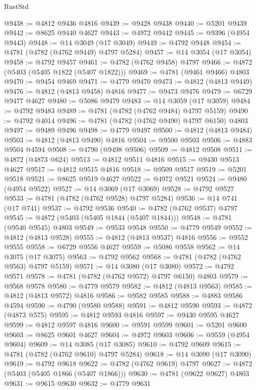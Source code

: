\begin{lexlean}{RustStd}
\begin{coremodule}
@9438 := @4812 @9436 @4816
@9439 := @9428 @9438
@9440 := @5201 @9439
@9442 := @8625 @9440 @4627
@9443 := @4972 @9442
@9445 := @9396 (@4954 @9443)
@9448 := @14 @3049 (@17 @3049)
@9449 := @4792 @9448
@9454 := @4781 (@4782 (@4762 @9449) @4797 @5284)
@9457 := @14 @3054 (@17 @3054)
@9458 := @4792 @9457
@9461 := @4782 (@4762 @9458) @4797
@9466 := @4872 (@5403 (@5405 @1822 (@5407 @1822)))
@9469 := @4781 (@9461 @9466) @4803
@9470 := @9454 @9469
@9471 := @4779 @9470
@9473 := @4812 (@4813 @9449)
@9476 := @4812 (@4813 @9458) @4816
@9477 := @9473 @9476
@9479 := @6729 @9477 @4627
@9480 := @5086 @9479
@9483 := @14 @3059 (@17 @3059)
@9484 := @4792 @9483
@9489 := @4781 (@4782 (@4762 @9484) @4797 @5159)
@9490 := @4792 @4014
@9496 := @4781 (@4782 (@4762 @9490) @4797 @6150) @4803
@9497 := @9489 @9496
@9498 := @4779 @9497
@9500 := @4812 (@4813 @9484)
@9503 := @4812 (@4813 @9490) @4816
@9504 := @9500 @9503
@9506 := @4883 @9504 @4594
@9508 := @4790 (@9498 @9506)
@9509 := @4812 @9508
@9511 := @4872 (@4873 @624)
@9513 := @4812 @9511 @4816
@9515 := @9430 @9513 @4627
@9517 := @4812 @9515 @4816
@9518 := @9509 @9517
@9519 := @5201 @9518
@9521 := @8625 @9519 @4627
@9522 := @4972 @9521
@9524 := @9480 (@4954 @9522)
@9527 := @14 @3069 (@17 @3069)
@9528 := @4792 @9527
@9533 := @4781 (@4782 (@4762 @9528) @4797 @5284)
@9536 := @14 @741 (@17 @741)
@9537 := @4792 @9536
@9540 := @4782 (@4762 @9537) @4797
@9545 := @4872 (@5403 (@5405 @1844 (@5407 @1844)))
@9548 := @4781 (@9540 @9545) @4803
@9549 := @9533 @9548
@9550 := @4779 @9549
@9552 := @4812 (@4813 @9528)
@9555 := @4812 (@4813 @9537) @4816
@9556 := @9552 @9555
@9558 := @6729 @9556 @4627
@9559 := @5086 @9558
@9562 := @14 @3075 (@17 @3075)
@9563 := @4792 @9562
@9568 := @4781 (@4782 (@4762 @9563) @4797 @5159)
@9571 := @14 @3080 (@17 @3080)
@9572 := @4792 @9571
@9578 := @4781 (@4782 (@4762 @9572) @4797 @6150) @4803
@9579 := @9568 @9578
@9580 := @4779 @9579
@9582 := @4812 (@4813 @9563)
@9585 := @4812 (@4813 @9572) @4816
@9586 := @9582 @9585
@9588 := @4883 @9586 @4594
@9590 := @4790 (@9580 @9588)
@9591 := @4812 @9590
@9593 := @4872 (@4873 @575)
@9595 := @4812 @9593 @4816
@9597 := @9430 @9595 @4627
@9599 := @4812 @9597 @4816
@9600 := @9591 @9599
@9601 := @5201 @9600
@9603 := @8625 @9601 @4627
@9604 := @4972 @9603
@9606 := @9559 (@4954 @9604)
@9609 := @14 @3085 (@17 @3085)
@9610 := @4792 @9609
@9615 := @4781 (@4782 (@4762 @9610) @4797 @5284)
@9618 := @14 @3090 (@17 @3090)
@9619 := @4792 @9618
@9622 := @4782 (@4762 @9619) @4797
@9627 := @4872 (@5403 (@5405 @1866 (@5407 @1866)))
@9630 := @4781 (@9622 @9627) @4803
@9631 := @9615 @9630
@9632 := @4779 @9631

\end{coremodule}
\end{lexlean}
